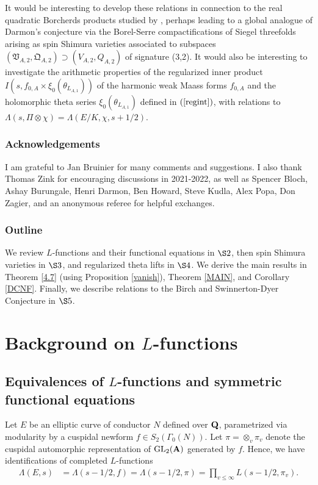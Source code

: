 \documentclass{amsart}
\theoremstyle{definition}
\begin{document}
It would be interesting to develop these relations in connection to the real quadratic Borcherds products studied by \cite{DaVo}, 
perhaps leading to a global analogue of Darmon's conjecture \cite[Conjecture 5.6]{Da} via the Borel-Serre compactifications of Siegel threefolds arising as 
spin Shimura varieties associated to subspaces $(\mathfrak{V}_{A,2}, \mathfrak{Q}_{A, 2}) \supset (V_{A, 2}, Q_{A,2})$ of signature (3,2). 
It would also be interesting to investigate the arithmetic properties of the regularized inner product $I(s, f_{0, A} \times \xi_0(\theta_{L_{A,1}}))$
of the harmonic weak Maass forms $f_{0,A}$ and the holomorphic theta series $\xi_0(\theta_{L_{A,1}})$ defined in $(\ref{regint})$, with relations to $\Lambda(s, \Pi \otimes \chi) = \Lambda(E/K, \chi, s+1/2)$.

\subsubsection*{Acknowledgements} I am grateful to Jan Bruinier for many comments and suggestions.
I also thank Thomas Zink for encouraging discussions in 2021-2022, as well as Spencer Bloch, Ashay Burungale,
Henri Darmon, Ben Howard, Steve Kudla, Alex Popa, Don Zagier, and an anonymous referee for helpful exchanges.

\subsubsection*{Outline} We review $L$-functions and their functional equations in $\S 2$, then spin Shimura varieties in $\S 3$, and regularized theta lifts in $\S4$.
We derive the main results in Theorem \ref{4.7} (using Proposition \ref{vanish}), Theorem \ref{MAIN}, and Corollary \ref{DCNF}.
Finally, we describe relations to the Birch and Swinnerton-Dyer Conjecture in $\S 5$.

\section{Background on $L$-functions}

\subsection{Equivalences of $L$-functions and symmetric functional equations}

Let $E$ be an elliptic curve of conductor $N$ defined over ${\bf{Q}}$, parametrized via modularity by a cuspidal 
newform $f \in S_2(\Gamma_0(N))$. Let $\pi = \otimes_v \pi_v$ denote the cuspidal automorphic representation
of $\operatorname{GL}_2({\bf{A}})$ generated by $f$. Hence, we have identifications of completed $L$-functions 
\begin{align}\label{id1} \Lambda(E, s) &= \Lambda (s-1/2 , f) = \Lambda(s-1/2, \pi) = \prod_{v \leq \infty} L(s-1/2, \pi_v). \end{align}
\end{document}
